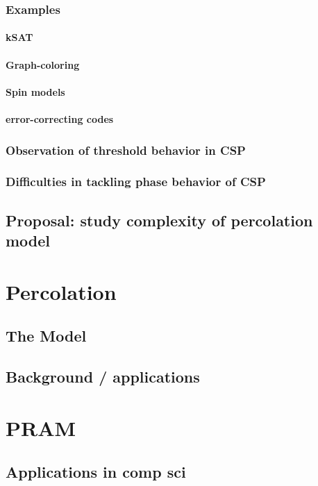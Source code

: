 \documentclass{umthesis}
\begin{document}
\subsubsection{Examples}
\label{sec-4.1.1.1}
\paragraph{kSAT}
\label{sec-4.1.1.1.1}
\paragraph{Graph-coloring}
\label{sec-4.1.1.1.2}
\paragraph{Spin models}
\label{sec-4.1.1.1.3}
\paragraph{error-correcting codes}
\label{sec-4.1.1.1.4}
\subsubsection{Observation of threshold behavior in CSP}
\label{sec-4.1.1.2}
\subsubsection{Difficulties in tackling phase behavior of CSP}
\label{sec-4.1.1.3}
\subsection{Proposal: study complexity of percolation model}
\label{sec-4.1.2}
\section{Percolation}
\label{sec-4.2}
\subsection{The Model}
\label{sec-4.2.1}
\subsection{Background / applications}
\label{sec-4.2.2}
\section{PRAM}
\label{sec-4.3}
\subsection{Applications in comp sci}
\label{sec-4.3.1}
\end{document}

